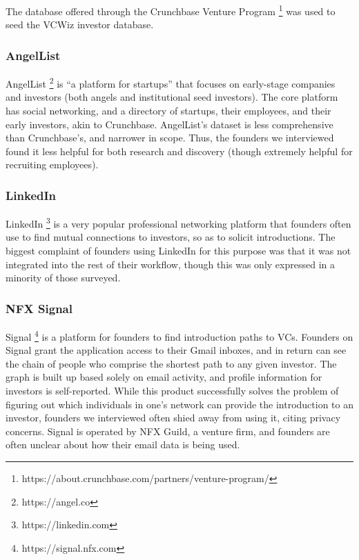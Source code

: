 The database offered through the Crunchbase Venture Program \footnote{https://about.crunchbase.com/partners/venture-program/} was used to seed the VCWiz investor database.

\subsubsection{AngelList}

AngelList \footnote{https://angel.co} is ``a platform for startups'' that focuses on early-stage companies and investors (both angels and institutional seed investors). The core platform has social networking, and a directory of startups, their employees, and their early investors, akin to Crunchbase. AngelList's dataset is less comprehensive than Crunchbase's, and narrower in scope. Thus, the founders we interviewed found it less helpful for both research and discovery (though extremely helpful for recruiting employees).

\subsubsection{LinkedIn}

LinkedIn \footnote{https://linkedin.com} is a very popular professional networking platform that founders often use to find mutual connections to investors, so as to solicit introductions. The biggest complaint of founders using LinkedIn for this purpose was that it was not integrated into the rest of their workflow, though this was only expressed in a minority of those surveyed.

\subsubsection{NFX Signal}

Signal \footnote{https://signal.nfx.com} is a platform for founders to find introduction paths to VCs. Founders on Signal grant the application access to their Gmail inboxes, and in return can see the chain of people who comprise the shortest path to any given investor. The graph is built up based solely on email activity, and profile information for investors is self-reported. While this product successfully solves the problem of figuring out which individuals in one's network can provide the introduction to an investor, founders we interviewed often shied away from using it, citing privacy concerns. Signal is operated by NFX Guild, a venture firm, and founders are often unclear about how their email data is being used.

